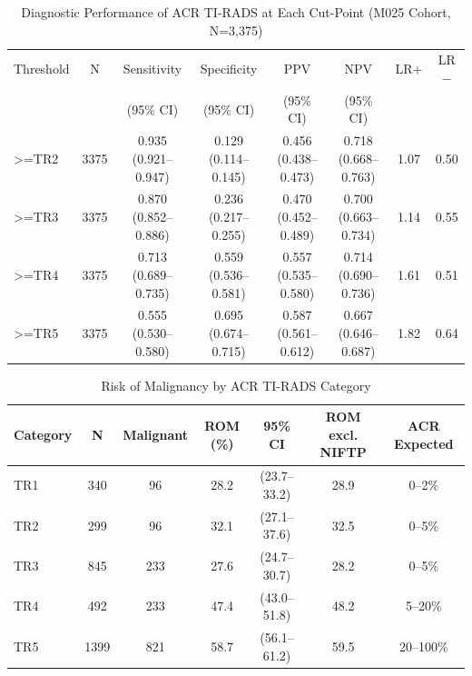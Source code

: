 \documentclass{article}
\begin{document}
\begin{table}[ht]
\centering
\caption{Diagnostic Performance of ACR TI-RADS at Each Cut-Point (M025 Cohort, N=3,375)}
\begin{tabular}{lccccccc}
\toprule
Threshold & N & Sensitivity & Specificity & PPV & NPV & LR+ & LR$-$ \\
 & & (95\% CI) & (95\% CI) & (95\% CI) & (95\% CI) & & \\
\midrule
>=TR2 & 3375 & 0.935 (0.921–0.947) & 0.129 (0.114–0.145) & 0.456 (0.438–0.473) & 0.718 (0.668–0.763) & 1.07 & 0.50 \\
>=TR3 & 3375 & 0.870 (0.852–0.886) & 0.236 (0.217–0.255) & 0.470 (0.452–0.489) & 0.700 (0.663–0.734) & 1.14 & 0.55 \\
>=TR4 & 3375 & 0.713 (0.689–0.735) & 0.559 (0.536–0.581) & 0.557 (0.535–0.580) & 0.714 (0.690–0.736) & 1.61 & 0.51 \\
>=TR5 & 3375 & 0.555 (0.530–0.580) & 0.695 (0.674–0.715) & 0.587 (0.561–0.612) & 0.667 (0.646–0.687) & 1.82 & 0.64 \\
\bottomrule
\end{tabular}
\end{table}

\begin{table}[ht]
\centering
\caption{Risk of Malignancy by ACR TI-RADS Category}
\begin{tabular}{lcccccc}
\toprule
Category & N & Malignant & ROM (\%) & 95\% CI & ROM excl. NIFTP & ACR Expected \\
\midrule
TR1 & 340 & 96 & 28.2 & (23.7–33.2) & 28.9 & 0–2\% \\
TR2 & 299 & 96 & 32.1 & (27.1–37.6) & 32.5 & 0–5\% \\
TR3 & 845 & 233 & 27.6 & (24.7–30.7) & 28.2 & 0–5\% \\
TR4 & 492 & 233 & 47.4 & (43.0–51.8) & 48.2 & 5–20\% \\
TR5 & 1399 & 821 & 58.7 & (56.1–61.2) & 59.5 & 20–100\% \\
\bottomrule
\end{tabular}
\end{table}

\end{document}
